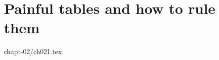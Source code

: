 \documentclass[12pt]{book}
\begin{document}
    \chapter{Painful tables and how to rule them} %
    \thispagestyle{empty} %
    {chapt-02/ch021.tex}

    \backmatter
    \clearpage

    \renewcommand{\baselinestretch}{1} %
    \printbibliography
    \renewcommand{\doitext}{}

    \clearpage
    \appendix
    \renewcommand{\thesection}{\Alph{section}} %
    
    \clearpage
\end{document}
